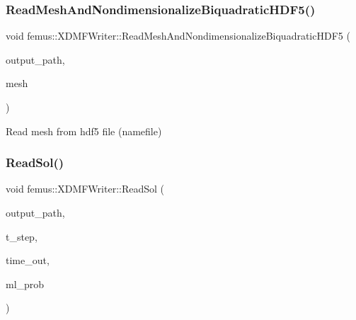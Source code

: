 \mbox{\label{classfemus_1_1_x_d_m_f_writer_a61361981a0eea2bce4711b14d6e59836}} 
\subsubsection{\texorpdfstring{Read\+Mesh\+And\+Nondimensionalize\+Biquadratic\+H\+D\+F5()}{ReadMeshAndNondimensionalizeBiquadraticHDF5()}}
{\footnotesize\ttfamily void femus\+::\+X\+D\+M\+F\+Writer\+::\+Read\+Mesh\+And\+Nondimensionalize\+Biquadratic\+H\+D\+F5 (\begin{DoxyParamCaption}\item[{const std\+::string}]{output\+\_\+path,  }\item[{\mbox{\hyperlink{classfemus_1_1_multi_level_mesh_two}{Multi\+Level\+Mesh\+Two}} \&}]{mesh }\end{DoxyParamCaption})\hspace{0.3cm}{\ttfamily [static]}}



Read mesh from hdf5 file (namefile) 

\mbox{\label{classfemus_1_1_x_d_m_f_writer_a81c3afaed501b810d42927539387b108}} 
\subsubsection{\texorpdfstring{Read\+Sol()}{ReadSol()}}
{\footnotesize\ttfamily void femus\+::\+X\+D\+M\+F\+Writer\+::\+Read\+Sol (\begin{DoxyParamCaption}\item[{const std\+::string}]{output\+\_\+path,  }\item[{const \mbox{\hyperlink{_typedefs_8hpp_a91ad9478d81a7aaf2593e8d9c3d06a14}{uint}}}]{t\+\_\+step,  }\item[{double \&}]{time\+\_\+out,  }\item[{const \mbox{\hyperlink{classfemus_1_1_multi_level_problem}{Multi\+Level\+Problem}} \&}]{ml\+\_\+prob }\end{DoxyParamCaption})\hspace{0.3cm}{\ttfamily [static]}}



